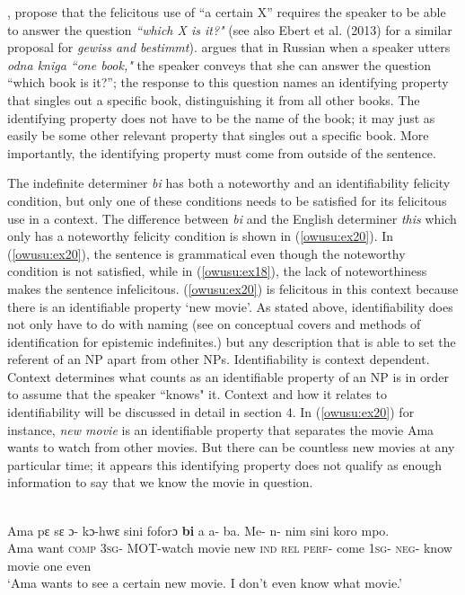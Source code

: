 \documentclass[output=paper,modfonts,nonflat,draftmode]{langsci/langscibook}
\begin{document}
\citet{AbuschRooth1997}, propose that the felicitous use of  ``a certain X” requires the speaker to be able to answer the question \emph{``which X is it?"} (see also Ebert et al. (2013) for a similar proposal for \emph{gewiss and bestimmt}). \citet{Aloni2001} argues that in Russian when a  speaker utters \emph{odna kniga ``one book,"} the speaker conveys that she can answer the question ``which book is it?”; the response to this question names an identifying property that singles out a specific book, distinguishing it from all other books. The identifying property does not have to be the name of the book; it may just as easily be some other relevant property that singles out a specific book. More importantly, the identifying property must come from outside of the sentence.


The indefinite determiner \emph{bi} has both a noteworthy and an identifiability felicity condition, but only one of these conditions needs to be satisfied for its felicitous use in a context. The difference between \emph{bi} and the English determiner \emph{this} which only has a noteworthy felicity condition is shown in (\ref{owusu:ex20}). In  (\ref{owusu:ex20}), the sentence is grammatical even though the noteworthy condition is not satisfied, while in (\ref{owusu:ex18}), the lack of noteworthiness makes the sentence infelicitous. (\ref{owusu:ex20}) is felicitous in this context because there is an identifiable property `new movie'. As stated above, identifiability does not only have to do with naming (see \citet{AloniPort2015} on conceptual covers and methods of identification for epistemic indefinites.) but any description that is able to set the referent of an NP apart from other NPs. Identifiability is context dependent. Context determines what counts as an identifiable property of an NP is in order to assume that the speaker ``knows" it. Context and how it relates to identifiability will be discussed in detail in section 4. In (\ref{owusu:ex20}) for instance, \emph{new movie} is an identifiable property that separates the movie Ama wants to watch from other movies.  But there can be countless new movies at any particular time; it appears this identifying property does not qualify as enough information to say that we know the movie in question. 

\ea
{}\\
\ea\label{owusu:ex20}
\gll Ama pε sε ɔ- kɔ-hwε sini foforɔ \textbf{bi} a a- ba. Me- n- nim sini koro mpo.\\
Ama want \textsc{comp} \textsc{3sg}- \textsc{MOT}-watch movie new \textsc{ind} \textsc{rel} \textsc{perf}- come \textsc{1sg}- \textsc{neg}- know movie one even \\
\glt `Ama wants to see a certain new movie. I don't even know what movie.'
\end{document}
